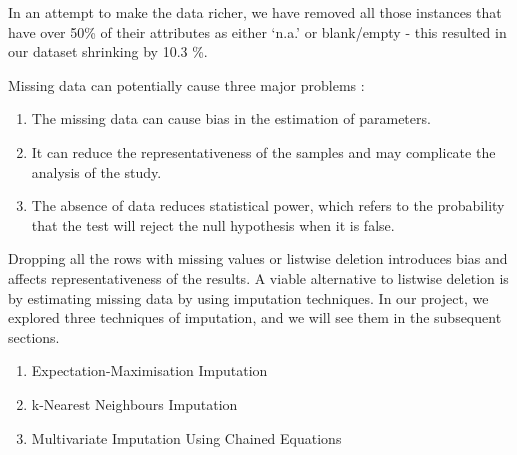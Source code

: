 In an attempt to make the data richer, we have removed all those instances that have over 50\% of their attributes as either `n.a.' or blank/empty - this resulted in our dataset shrinking by 10.3 \%. 

Missing data can potentially cause three major problems \cite{kang2013prevention}:
\begin{enumerate}
    \item The missing data can cause bias in the estimation of parameters.
    \item It can reduce the representativeness of the samples and may complicate the analysis of the study.
    \item The absence of data reduces statistical power, which refers to the probability that the test will reject the null hypothesis when it is false.
\end{enumerate}

Dropping all the rows with missing values or listwise deletion introduces bias and affects representativeness of the results. A viable alternative to listwise deletion is by estimating missing data by using imputation techniques. In our project, we explored three techniques of imputation, and we will see them in the subsequent sections.

\begin{enumerate}
    
    
    \item Expectation-Maximisation Imputation
    \item k-Nearest Neighbours Imputation
    \item Multivariate Imputation Using Chained Equations
\end{enumerate}


